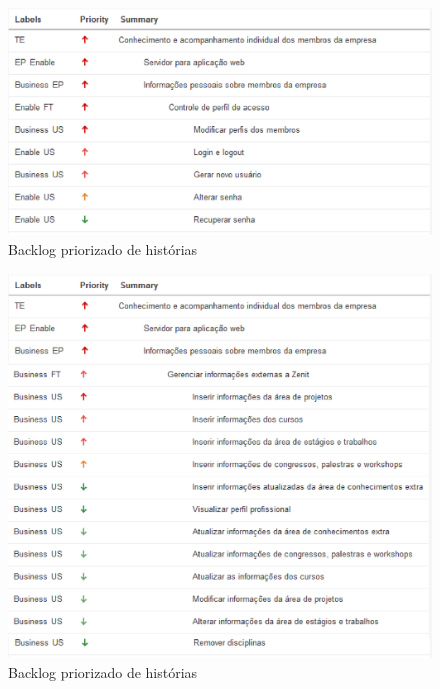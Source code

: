 \begin{figure}[H]
    \centering
    \includegraphics[keepaspectratio=true,scale=0.6]{figuras/blus03.eps}
    \caption[Backlog história]{Backlog priorizado de histórias\label{backlogus03}}
\end{figure}

\begin{figure}[H]
    \centering
    \includegraphics[keepaspectratio=true,scale=0.6]{figuras/blus04.eps}
    \caption[Backlog história]{Backlog priorizado de histórias\label{backlogus04}}
\end{figure}


